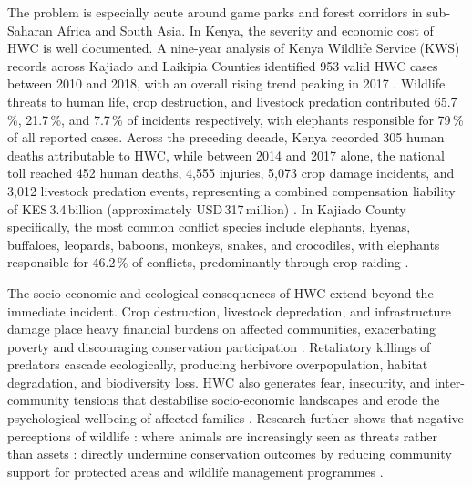 \documentclass[12pt,a4paper]{article}
\begin{document}
    The problem is especially acute around game parks and forest corridors in sub-Saharan
    Africa and South Asia. In Kenya, the severity and economic cost of HWC is well
    documented. A nine-year analysis of Kenya Wildlife Service (KWS) records across Kajiado
    and Laikipia Counties identified 953 valid HWC cases between 2010 and 2018, with an
    overall rising trend peaking in 2017 \cite{manoa2020}. Wildlife threats to human life,
    crop destruction, and livestock predation contributed 65.7\,\%, 21.7\,\%, and 7.7\,\% of
    incidents respectively, with elephants responsible for 79\,\% of all reported cases. Across
    the preceding decade, Kenya recorded 305 human deaths attributable to HWC, while
    between 2014 and 2017 alone, the national toll reached 452 human deaths, 4,555 injuries,
    5,073 crop damage incidents, and 3,012 livestock predation events, representing a combined
    compensation liability of KES\,3.4\,billion (approximately USD\,317\,million) \cite{manoa2020}.
    In Kajiado County specifically, the most common conflict species include elephants,
    hyenas, buffaloes, leopards, baboons, monkeys, snakes, and crocodiles, with elephants
    responsible for 46.2\,\% of conflicts, predominantly through crop raiding \cite{mbiki2025}.

    The socio-economic and ecological consequences of HWC extend beyond the immediate
    incident. Crop destruction, livestock depredation, and infrastructure damage place heavy
    financial burdens on affected communities, exacerbating poverty and discouraging
    conservation participation \cite{mbiki2025}. Retaliatory killings of predators cascade
    ecologically, producing herbivore overpopulation, habitat degradation, and biodiversity
    loss. HWC also generates fear, insecurity, and inter-community tensions that destabilise
    socio-economic landscapes and erode the psychological wellbeing of affected families
    \cite{mbiki2025}. Research further shows that negative perceptions of wildlife : where
    animals are increasingly seen as threats rather than assets : directly undermine conservation outcomes by reducing community support for protected areas and wildlife
    management programmes \cite{basak2023}.
\end{document}

